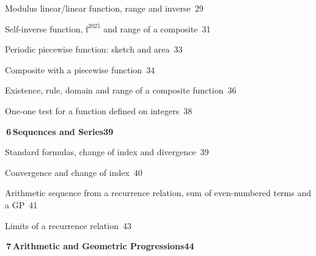 \documentclass[a4paper,openany]{book}
\begin{document}
{\noindent{}\quad Modulus linear/linear function, range and inverse\dotfill\ 29\par
\noindent{}\quad Self-inverse function, $\mathrm {f}^{2025}$ and range of a composite\dotfill\ 31\par
\noindent{}\quad Periodic piecewise function: sketch and area\dotfill\ 33\par
\noindent{}\quad Composite with a piecewise function\dotfill\ 34\par
\noindent{}\quad Existence, rule, domain and range of a composite function\dotfill\ 36\par
\noindent{}\quad One-one test for a function defined on integers\dotfill\ 38\par
\medskip\noindent\colorbox{blue!8}{\parbox{\dimexpr\textwidth-2\fboxsep}{\large\bfseries\color{blue!50!black}\colorbox{blue!50!black}{\color{white}\,6\,}\quad Sequences and Series\hfill 39}}\par\nopagebreak\smallskip\nopagebreak
\noindent{}\quad Standard formulas, change of index and divergence\dotfill\ 39\par
\noindent{}\quad Convergence and change of index\dotfill\ 40\par
\noindent{}\quad Arithmetic sequence from a recurrence relation, sum of even-numbered terms and a GP\dotfill\ 41\par
\noindent{}\quad Limits of a recurrence relation\dotfill\ 43\par
\medskip\noindent\colorbox{blue!8}{\parbox{\dimexpr\textwidth-2\fboxsep}{\large\bfseries\color{blue!50!black}\colorbox{blue!50!black}{\color{white}\,7\,}\quad Arithmetic and Geometric Progressions\hfill 44}}\par\nopagebreak\smallskip\nopagebreak
}
\end{document}
